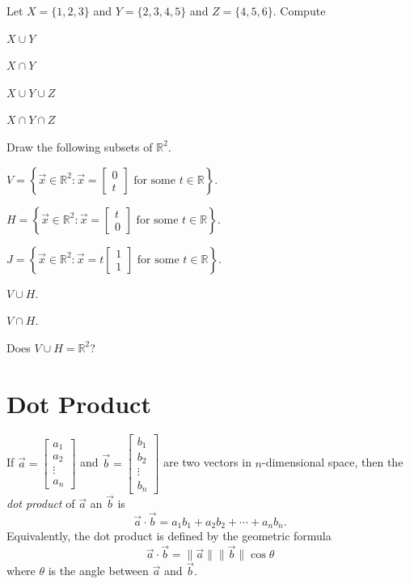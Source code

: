 \documentclass{problemset}
\newcommand{\R}{\mathbb{R}}
\begin{document}
	\question
	Let $X=\{1,2,3\}$ and $Y=\{2,3,4,5\}$ and $Z=\{4,5,6\}$.  Compute
	\begin{parts}
		\item $X\cup Y$
		\item $X\cap Y$
		\item $X\cup Y\cup Z$
		\item $X\cap Y\cap Z$
	\end{parts}

	\question
	Draw the following subsets of $\R^2$.
	\begin{parts}
		\item $V=\left\{\vec x\in\R^2:\vec x=\begin{bmatrix}0\\t\end{bmatrix}\text{ for some }t\in\R\right\}$.
		\item $H=\left\{\vec x\in\R^2:\vec x=\begin{bmatrix}t\\0\end{bmatrix}\text{ for some }t\in\R\right\}$.
		\item $J=\left\{\vec x\in\R^2:\vec x=t\begin{bmatrix}1\\1\end{bmatrix}\text{ for some }t\in\R\right\}$.
		\item $V\cup H$.
		\item $V\cap H$.
		\item Does $V\cup H=\R^2$?
	\end{parts}


\section*{Dot Product}

	\begin{definition}
	If $\vec a=\begin{bmatrix}a_1\\ a_2\\ \vdots \\ a_n\end{bmatrix}$ and 
	$\vec b=\begin{bmatrix}b_1\\ b_2\\ \vdots \\ b_n\end{bmatrix}$ are two vectors in $n$-dimensional
		space, then the \emph{dot product} of $\vec a$ an $\vec b$ is
	\[
		\vec a\cdot\vec b = a_1b_1+a_2b_2+\cdots+a_nb_n.
	\]
	Equivalently, the dot product is defined by the geometric formula
	\[
		\vec a\cdot \vec b = \|\vec a\|\|\vec b\|\cos \theta
	\]
	where $\theta$ is the angle between $\vec a$ and $\vec b$.
	\end{definition}
	
\end{document}

